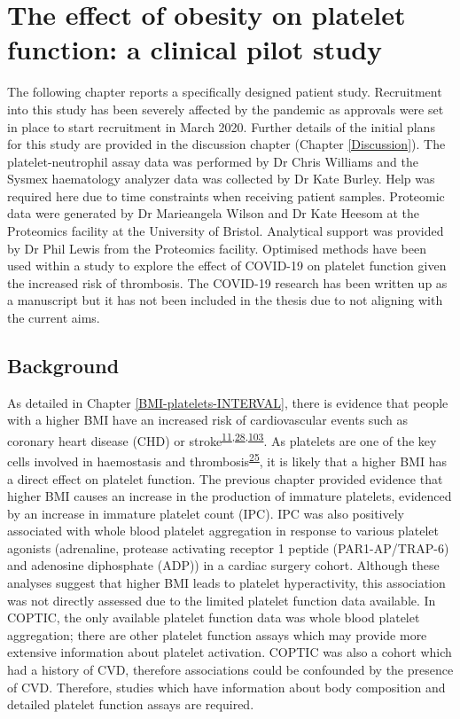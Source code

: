 \documentclass[11pt,twoside]{bristolthesis}
\begin{document}
\hypertarget{BMI-platelets-clinic}{%
\chapter{The effect of obesity on platelet function: a clinical pilot study}\label{BMI-platelets-clinic}}

The following chapter reports a specifically designed patient study. Recruitment into this study has been severely affected by the pandemic as approvals were set in place to start recruitment in March 2020. Further details of the initial plans for this study are provided in the discussion chapter (Chapter \ref{Discussion}). The platelet-neutrophil assay data was performed by Dr Chris Williams and the Sysmex haematology analyzer data was collected by Dr Kate Burley. Help was required here due to time constraints when receiving patient samples. Proteomic data were generated by Dr Marieangela Wilson and Dr Kate Heesom at the Proteomics facility at the University of Bristol. Analytical support was provided by Dr Phil Lewis from the Proteomics facility. Optimised methods have been used within a study to explore the effect of COVID-19 on platelet function given the increased risk of thrombosis. The COVID-19 research has been written up as a manuscript but it has not been included in the thesis due to not aligning with the current aims.

\hypertarget{background-2}{%
\section{Background}\label{background-2}}

As detailed in Chapter \ref{BMI-platelets-INTERVAL}, there is evidence that people with a higher BMI have an increased risk of cardiovascular events such as coronary heart disease (CHD) or stroke\textsuperscript{\protect\hyperlink{ref-Nordestgaard2012}{11},\protect\hyperlink{ref-Dale2017}{28},\protect\hyperlink{ref-Wolk2003a}{103}}. As platelets are one of the key cells involved in haemostasis and thrombosis\textsuperscript{\protect\hyperlink{ref-Koupenova2017a}{25}}, it is likely that a higher BMI has a direct effect on platelet function. The previous chapter provided evidence that higher BMI causes an increase in the production of immature platelets, evidenced by an increase in immature platelet count (IPC). IPC was also positively associated with whole blood platelet aggregation in response to various platelet agonists (adrenaline, protease activating receptor 1 peptide (PAR1-AP/TRAP-6) and adenosine diphosphate (ADP)) in a cardiac surgery cohort. Although these analyses suggest that higher BMI leads to platelet hyperactivity, this association was not directly assessed due to the limited platelet function data available. In COPTIC, the only available platelet function data was whole blood platelet aggregation; there are other platelet function assays which may provide more extensive information about platelet activation. COPTIC was also a cohort which had a history of CVD, therefore associations could be confounded by the presence of CVD. Therefore, studies which have information about body composition and detailed platelet function assays are required.
\end{document}
